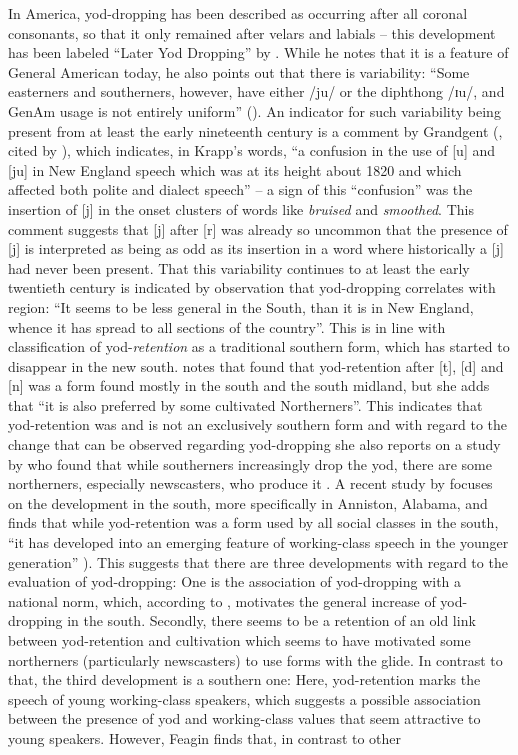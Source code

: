 In America, yod-dropping has been described as occurring after all coronal consonants, so that it only remained after velars and labials – this development has been labeled “Later Yod Dropping” by \citet[247]{Wells1982}. While he notes that it is a feature of General American today, he also points out that there is variability: “Some easterners and southerners, however, have either /ju/ or the diphthong /ɪu/, and GenAm usage is not entirely uniform” (\citeyear[247]{Wells1982}). An indicator for such variability being present from at least the early nineteenth century is a comment by Grandgent (\citeyear[224--226]{Grandgent1899}, cited by \citealt[196]{Krapp1919}), which indicates, in Krapp’s words, “a confusion in the use of [u] and [ju] in New England speech which was at its height about 1820 and which affected both polite and dialect speech” – a sign of this “confusion” was the insertion of [j] in the onset clusters of words like \emph{bruised} and \emph{smoothed}. This comment suggests that [j] after [r] was already so uncommon that the presence of [j] is interpreted as being as odd as its insertion in a word where historically a [j] had never been present. That this variability continues to at least the early twentieth century is indicated by  observation that yod-dropping correlates with region: “It seems to be less general in the South, than it is in New England, whence it has spread to all sections of the country”. This is in line with  classification of yod-\emph{retention} as a traditional southern form, which has started to disappear in the new south. \citet{Phillips1994} notes that \citet[174]{Kurath1961} found that yod-retention after [t], [d] and [n] was a form found mostly in the south and the south midland, but she adds that “it is also preferred by some cultivated Northerners”. This indicates that yod-retention was and is not an exclusively southern form and with regard to the change that can be observed regarding yod-dropping she also reports on a study by \citet{Pitts1986} who found that while southerners increasingly drop the yod, there are some northerners, especially newscasters, who produce it \citep[115]{Phillips1994}. A recent study by \citet{Feagin2015} focuses on the development in the south, more specifically in Anniston, Alabama, and finds that while yod-retention was a form used by all social classes in the south, “it has developed into an emerging feature of working-class speech in the younger generation” \citep[361--362]{Feagin2015}). This suggests that there are three developments with regard to the evaluation of yod-dropping: One is the association of yod-dropping with a national norm, which, according to \citet[272]{Schneider2004}, motivates the general increase of yod-dropping in the south. Secondly, there seems to be a retention of an old link between yod-retention and cultivation which seems to have motivated some northerners (particularly newscasters) to use forms with the glide. In contrast to that, the third development is a southern one: Here, yod-retention marks the speech of young working-class speakers, which suggests a possible association between the presence of yod and working-class values that seem attractive to young speakers. However, Feagin finds that, in contrast to other 